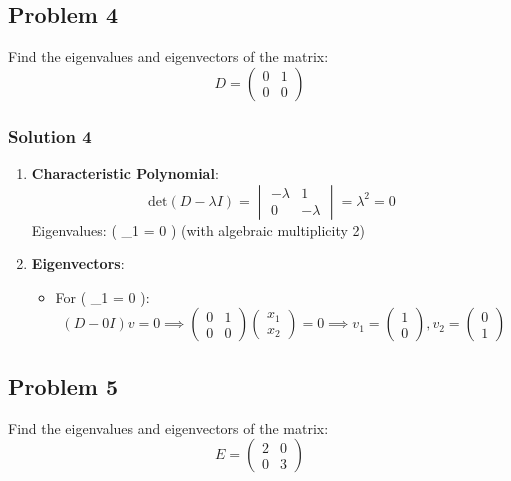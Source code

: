 \documentclass[
  letterpaper,
  DIV=11,
  numbers=noendperiod]{scrartcl}
\providecommand{\tightlist}{%
  \setlength{\itemsep}{0pt}\setlength{\parskip}{0pt}}\usepackage{longtable,booktabs,array}
\begin{document}
\subsection{Problem 4}\label{problem-4}

Find the eigenvalues and eigenvectors of the matrix: \[
D = \begin{pmatrix} 0 & 1 \\ 0 & 0 \end{pmatrix}
\]

\subsubsection{Solution 4}\label{solution-4}

\begin{enumerate}
\def\labelenumi{\arabic{enumi}.}
\item
  \textbf{Characteristic Polynomial}: \[
  \text{det}(D - \lambda I) = \begin{vmatrix} -\lambda & 1 \\ 0 & -\lambda \end{vmatrix} = \lambda^2 = 0
  \] Eigenvalues: ( \lambda\_1 = 0 ) (with algebraic multiplicity 2)
\item
  \textbf{Eigenvectors}:

  \begin{itemize}
  \tightlist
  \item
    For ( \lambda\_1 = 0 ): \[
    (D - 0I)v = 0 \implies \begin{pmatrix} 0 & 1 \\ 0 & 0 \end{pmatrix}\begin{pmatrix} x_1 \\ x_2 \end{pmatrix} = 0 \implies v_1 = \begin{pmatrix} 1 \\ 0 \end{pmatrix}, v_2 = \begin{pmatrix} 0 \\ 1 \end{pmatrix}
    \]
  \end{itemize}
\end{enumerate}

\subsection{Problem 5}\label{problem-5}

Find the eigenvalues and eigenvectors of the matrix: \[
E = \begin{pmatrix} 2 & 0 \\ 0 & 3 \end{pmatrix}
\]
\end{document}

